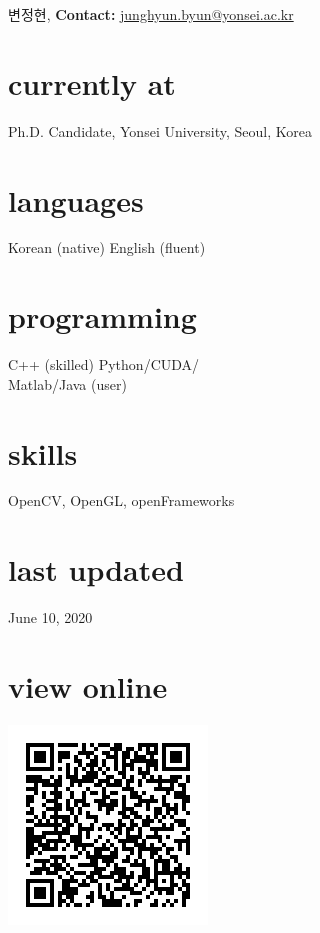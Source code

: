 \documentclass[]{friggeri-cv}
\begin{document}
       { 변정현, 
       \textbf{Contact:}
       \href{mailto:junghyun.byun@yonsei.ac.kr}{junghyun.byun@yonsei.ac.kr}}

\begin{aside}
  \section{currently at}
    Ph.D. Candidate, Yonsei University, Seoul, Korea
  \section{languages}
    Korean (native)
    English (fluent)
  \section{programming}
    C++ (skilled)
    Python/CUDA/\\Matlab/Java (user)
  \section{skills}
    OpenCV, OpenGL, openFrameworks
  \section{last updated}
    June 10, 2020
  \section{view online}
    \includegraphics[width=\textwidth]{data/cv_qr_code}
\end{aside}
\end{document}
